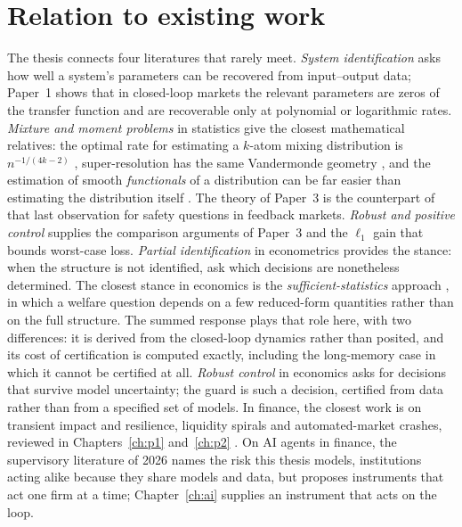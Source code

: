 \section{Relation to existing work}

The thesis connects four literatures that rarely meet. \emph{System identification} \citep{t:ljung1999} asks how well a system's parameters can be recovered from input--output data; Paper~1 shows that in closed-loop markets the relevant parameters are zeros of the transfer function and are recoverable only at polynomial or logarithmic rates. \emph{Mixture and moment problems} in statistics give the closest mathematical relatives: the optimal rate for estimating a $k$-atom mixing distribution is $n^{-1/(4k-2)}$ \citep{t:heinrich2018,t:wu2020}, super-resolution has the same Vandermonde geometry \citep{t:candes2014,t:moitra2015}, and the estimation of smooth \emph{functionals} of a distribution can be far easier than estimating the distribution itself \citep{t:lepski1999,t:cai2011}. The theory of Paper~3 is the counterpart of that last observation for safety questions in feedback markets. \emph{Robust and positive control} \citep{t:megretski1997,t:farina2000,t:rantzer2015} supplies the comparison arguments of Paper~3 and the $\ell_1$ gain that bounds worst-case loss. \emph{Partial identification} in econometrics \citep{t:manski2003} provides the stance: when the structure is not identified, ask which decisions are nonetheless determined. The closest stance in economics is the \emph{sufficient-statistics} approach \citep{t:chetty2009}, in which a welfare question depends on a few reduced-form quantities rather than on the full structure. The summed response plays that role here, with two differences: it is derived from the closed-loop dynamics rather than posited, and its cost of certification is computed exactly, including the long-memory case in which it cannot be certified at all. \emph{Robust control} in economics \citep{t:hansensargent2008} asks for decisions that survive model uncertainty; the guard is such a decision, certified from data rather than from a specified set of models. In finance, the closest work is on transient impact and resilience, liquidity spirals and automated-market crashes, reviewed in Chapters~\ref{ch:p1} and~\ref{ch:p2} \citep{t:brunnermeier2009,t:kirilenko2017}. On AI agents in finance, the supervisory literature of 2026 \citep{t:fsb2026,t:bis2026} names the risk this thesis models, institutions acting alike because they share models and data, but proposes instruments that act one firm at a time; Chapter~\ref{ch:ai} supplies an instrument that acts on the loop.

